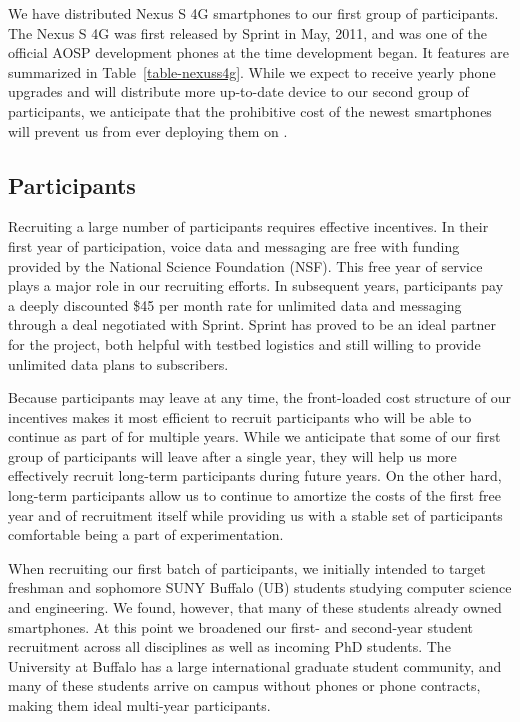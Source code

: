 We have distributed Nexus S 4G smartphones to our first group of
participants. The Nexus S 4G was first released by Sprint in May, 2011, and
was one of the official AOSP development phones at the time \PhoneLab{}
development began. It features are summarized in Table~\ref{table-nexuss4g}.
While we expect to receive yearly phone upgrades and will distribute more
up-to-date device to our second group of participants, we anticipate that the
prohibitive cost of the newest smartphones will prevent us from ever
deploying them on \PhoneLab{}.

\subsection{Participants}

Recruiting a large number of \PhoneLab{} participants requires effective
incentives. In their first year of \PhoneLab{} participation, voice data and
messaging are free with funding provided by the National Science Foundation
(NSF). This free year of service plays a major role in our recruiting
efforts. In subsequent years, participants pay a deeply discounted \$45 per
month rate for unlimited data and messaging through a deal negotiated with
Sprint. Sprint has proved to be an ideal partner for the \PhoneLab{} project,
both helpful with testbed logistics and still willing to provide unlimited
data plans to subscribers.

Because participants may leave at any time, the front-loaded cost structure
of our incentives makes it most efficient to recruit participants who will be
able to continue as part of \PhoneLab{} for multiple years. While we
anticipate that some of our first group of participants will leave after a
single year, they will help us more effectively recruit long-term
participants during future years. On the other hard, long-term participants
allow us to continue to amortize the costs of the first free year and of
recruitment itself while providing us with a stable set of participants
comfortable being a part of \PhoneLab{} experimentation.

When recruiting our first batch of participants, we initially intended to
target freshman and sophomore SUNY Buffalo (UB) students studying computer
science and engineering. We found, however, that many of these students
already owned smartphones. At this point we broadened our first- and
second-year student recruitment across all disciplines as well as incoming
PhD students. The University at Buffalo has a large international graduate
student community, and many of these students arrive on campus without phones
or phone contracts, making them ideal multi-year \PhoneLab{} participants.

